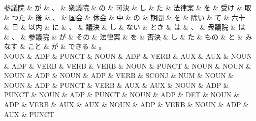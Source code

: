 \documentclass[tikz,border=5pt]{standalone}
\begin{document}
\small
\begin{dependency}[edge unit distance=12.0pt]
    \begin{deptext}[column sep=0.5em]
        参議院 \& が \& 、 \& 衆議院 \& の \& 可決 \& し \& た \& 法律案 \& を \& 受け \& 取 \& つた \& 後 \& 、 \& 国会 \& 休会 \& 中 \& の \& 期間 \& を \& 除い \& て \& 六十 \& 日 \& 以内 \& に \& 、 \& 議決 \& し \& ない \& とき \& は \& 、 \& 衆議院 \& は \& 、 \& 参議院 \& が \& その \& 法律案 \& を \& 否決 \& し \& た \& もの \& と \& みなす \& こと \& が \& できる \& 。\\
        NOUN \& ADP \& PUNCT \& NOUN \& ADP \& VERB \& AUX \& AUX \& NOUN \& ADP \& VERB \& VERB \& VERB \& NOUN \& PUNCT \& NOUN \& NOUN \& NOUN \& ADP \& NOUN \& ADP \& VERB \& SCONJ \& NUM \& NOUN \& NOUN \& ADP \& PUNCT \& VERB \& AUX \& AUX \& NOUN \& ADP \& PUNCT \& NOUN \& ADP \& PUNCT \& NOUN \& ADP \& DET \& NOUN \& ADP \& VERB \& AUX \& AUX \& NOUN \& ADP \& VERB \& NOUN \& ADP \& AUX \& PUNCT\\
    \end{deptext}
\end{dependency}
\end{document}
